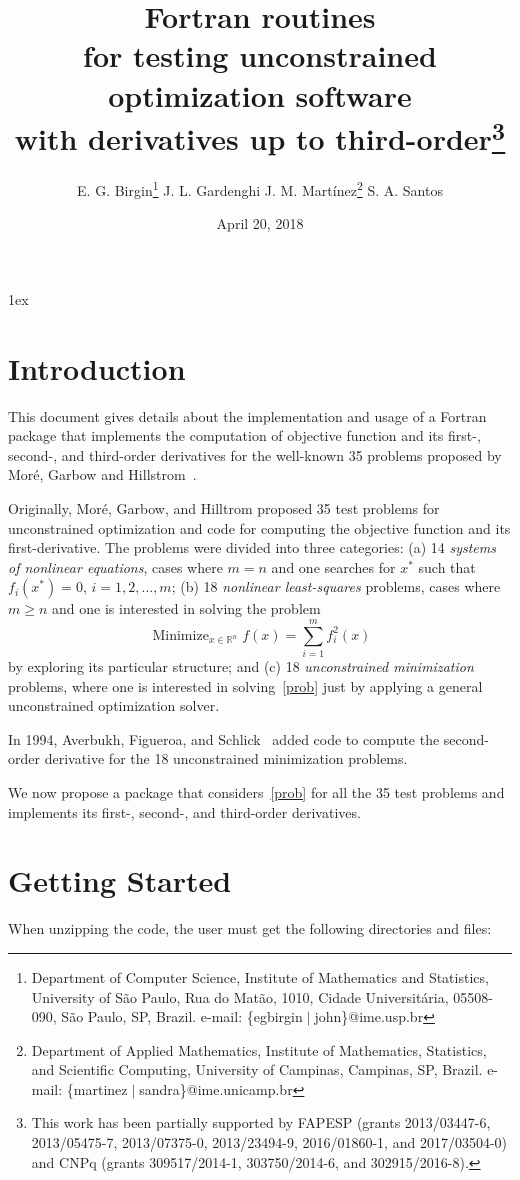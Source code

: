 \documentclass[11pt]{article}
\title{Fortran routines \\ for testing unconstrained
  optimization software \\ with derivatives up to
  third-order\thanks{This work has been partially supported by FAPESP
    (grants 2013/03447-6, 2013/05475-7, 2013/07375-0, 2013/23494-9,
    2016/01860-1, and 2017/03504-0) and CNPq (grants 309517/2014-1,
    303750/2014-6, and 302915/2016-8).}}
\author{E. G. Birgin\thanks{Department of Computer Science, Institute
    of Mathematics and Statistics, University of S\~ao Paulo, Rua do
    Mat\~ao, 1010, Cidade Universit\'aria, 05508-090, S\~ao Paulo, SP,
    Brazil. e-mail: \{egbirgin$\;|\;$john\}@ime.usp.br} \hspace{4ex}
  J. L. Gardenghi\footnotemark[2]\hspace{4ex}
  J. M. Mart\'{i}nez\thanks{Department of Applied Mathematics,
    Institute of Mathematics, Statistics, and Scientific Computing,
    University of Campinas, Campinas, SP, Brazil. e-mail:
    \{martinez$\;|\;$sandra\}@ime.unicamp.br} \hspace{4ex}
  S. A. Santos\footnotemark[3]}
\date{April 20, 2018}
\DeclareMathOperator*{\minimize}{Minimize}
\newcommand{\R}{\mathbb{R}}
\begin{document}
\maketitle

\tableofcontents

\parskip 1ex

\section{Introduction}

This document gives details about the implementation and usage of a
Fortran package that implements the computation of objective function
and its first-, second-, and third-order derivatives for the
well-known 35 problems proposed by Mor\'e, Garbow and
Hillstrom~\cite{mghcode,mgh}.

Originally, Mor\'e, Garbow, and Hilltrom proposed 35 test problems for
unconstrained optimization and code for computing the objective
function and its first-derivative. The problems were divided into
three categories: (a) 14 \textit{systems of nonlinear equations},
cases where $m=n$ and one searches for $x^*$ such that $f_i(x^*)=0$,
$i = 1, 2, \ldots, m$; (b) 18 \textit{nonlinear least-squares}
problems, cases where $m\geq n$ and one is interested in solving the
problem
\begin{equation} \label{prob}
  \minimize_{x \in \R^n} f(x) = \sum_{i=1}^m f_i^2(x)
\end{equation}
by exploring its particular structure; and (c) 18
\textit{unconstrained minimization} problems, where one is interested
in solving~\eqref{prob} just by applying a general unconstrained
optimization solver.

In 1994, Averbukh, Figueroa, and Schlick~\cite{mghrem} added code to
compute the second-order derivative for the 18 unconstrained
minimization problems.

We now propose a package that considers~\eqref{prob} for all the 35
test problems and implements its first-, second-, and third-order
derivatives.

\section{Getting Started}

When unzipping the code, the user must get the following directories
and files: \\
\end{document}
